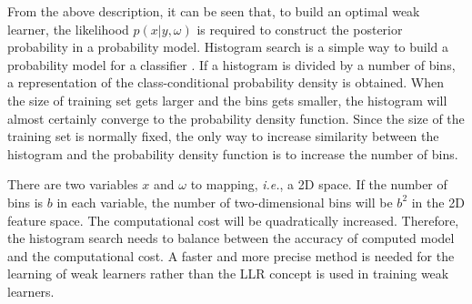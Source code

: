 From the above description, it can be seen that, to build an optimal weak learner, the likelihood $p(x|y,\omega)$ is required to construct the posterior probability in a probability model. Histogram search is a simple way to build a probability model for a classifier \cite{Forsyth2003}. If a histogram is divided by a number of bins, a representation of the class-conditional probability density is obtained. When the size of training set gets larger and the bins gets smaller, the histogram will almost certainly converge to the probability density function. Since the size of the training set is normally fixed, the only way to increase similarity between the histogram and the probability density function is to increase the number of bins.

There are two variables $x$ and $\omega$ to mapping, \textit{i.e.}, a 2D space. If the number of bins is $b$ in each variable, the number of two-dimensional bins will be $b^2$ in the 2D feature space. The computational cost will be quadratically increased. Therefore, the histogram search needs to balance between the accuracy of computed model and the computational cost. A faster and more precise method is needed for the learning of weak learners rather than the LLR concept is used in training weak learners.
